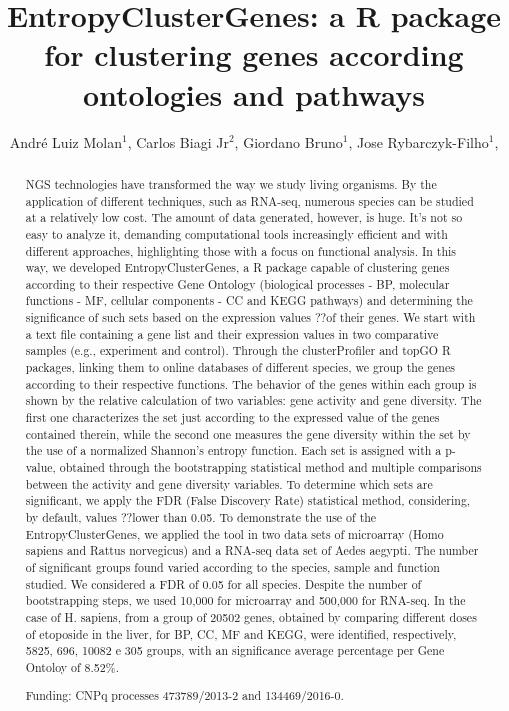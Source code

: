 \documentclass[twoside]{article}
\title{\vspace{-15mm}\fontsize{24pt}{10pt}\selectfont\textbf{ EntropyClusterGenes: a R package for clustering genes according ontologies and pathways }} %
\author{ André Luiz Molan$^{1}$, Carlos Biagi Jr$^{2}$, Giordano Bruno$^{1}$, Jose Rybarczyk-Filho$^{1}$, }
\affil{ 1 UNESP

2 UNESP - Botucatu/SP

 }
\date{}
\begin{document}
  
  
  \maketitle %
  
  
  \thispagestyle{fancy} %
  
  
  \begin{abstract}
  NGS technologies have transformed the way we study living organisms. By the application of different techniques, such as RNA-seq, numerous species can be studied at a relatively low cost. The amount of data generated, however, is huge. It’s not so easy to analyze it, demanding computational tools increasingly efficient and with different approaches, highlighting those with a focus on functional analysis. In this way, we developed EntropyClusterGenes, a R package capable of clustering genes according to their respective Gene Ontology (biological processes - BP, molecular functions - MF, cellular components - CC and KEGG pathways) and determining the significance of such sets based on the expression values ??of their genes. We start with a text file containing a gene list and their expression values in two comparative samples (e.g., experiment and control). Through the clusterProfiler and topGO R packages, linking them to online databases of different species, we group the genes according to their respective functions. The behavior of the genes within each group is shown by the relative calculation of two variables: gene activity and gene diversity. The first one characterizes the set just according to the expressed value of the genes contained therein, while the second one measures the gene diversity within the set by the use of a normalized Shannon’s entropy function. Each set is assigned with a p-value, obtained through the bootstrapping statistical method and multiple comparisons between the activity and gene diversity variables. To determine which sets are significant, we apply the FDR (False Discovery Rate) statistical method, considering, by default, values ??lower than 0.05. To demonstrate the use of the EntropyClusterGenes, we applied the tool in two data sets of microarray (Homo sapiens and Rattus norvegicus) and a RNA-seq data set of Aedes aegypti. The number of significant groups found varied according to the species, sample and function studied. We considered a FDR of 0.05 for all species. Despite the number of bootstrapping steps, we used 10,000 for microarray and 500,000 for RNA-seq. In the case of H. sapiens, from a group of 20502 genes, obtained by comparing different doses of etoposide in the liver, for BP, CC, MF and KEGG, were identified, respectively,  5825, 696, 10082 e 305 groups, with an significance average percentage per Gene Ontoloy of 8.52\%.
  
  Funding: CNPq processes 473789/2013-2 and 134469/2016-0. \\ 
  \end{abstract}
  
\end{document}
